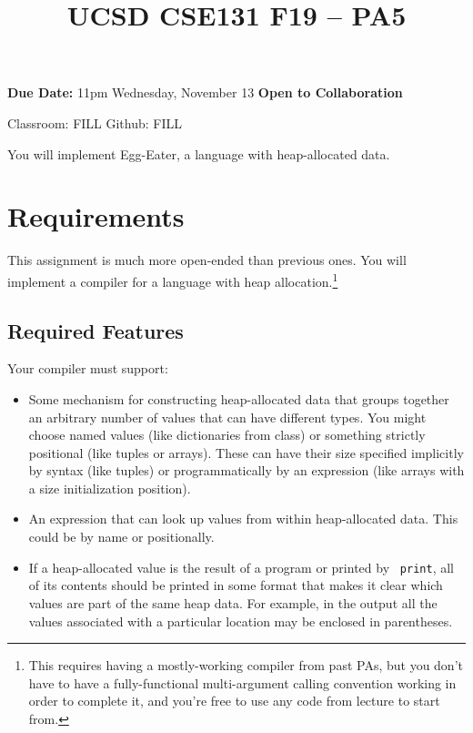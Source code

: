 \documentclass[10pt, oneside]{article}
\title{UCSD CSE131 F19 -- PA5}
\begin{document}
\maketitle 

{\bf Due Date:} 11pm Wednesday, November 13 \hspace{2em} {\bf Open to Collaboration}

Classroom: FILL \hspace{1em} Github: FILL

You will implement Egg-Eater, a language with heap-allocated data.

\section*{Requirements}

This assignment is much more open-ended than previous ones. You will
implement a compiler for a language with heap allocation.\footnote{This requires
having a mostly-working compiler from past PAs, but you don't have to have a
fully-functional multi-argument calling convention working in order to
complete it, and you're free to use any code from lecture to start from.}

\subsection*{Required Features}

Your compiler must support:

\begin{itemize}

\item Some mechanism for constructing heap-allocated data that groups
together an arbitrary number of values that can have different types. You
might choose named values (like dictionaries from class) or something
strictly positional (like tuples or arrays). These can have their size
specified implicitly by syntax (like tuples) or programmatically by an
expression (like arrays with a size initialization position).

\item An expression that can look up values from within heap-allocated data.
This could be by name or positionally.

\item If a heap-allocated value is the result of a program or printed by {\tt
print}, all of its contents should be printed in some format that makes it
clear which values are part of the same heap data. For example, in the output
all the values associated with a particular location may be enclosed in
parentheses.

\end{itemize}
\end{document}
